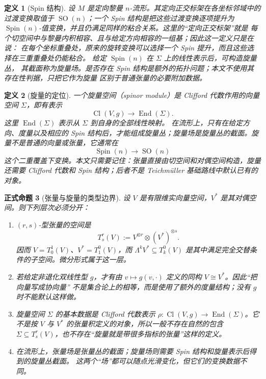 \documentclass[UTF8,fontset=none,a4paper,11pt]{ctexart}
\theoremstyle{foundation-definition}
\newtheorem{definition}{定义}[section]
\theoremstyle{foundation-theorem}
\theoremstyle{foundation-proposition}
\newtheorem{proposition}[definition]{正式命题}
\theoremstyle{foundation-example}
\theoremstyle{foundation-remark}
\theoremstyle{foundation-theorem}
\begin{document}
\begin{definition}[Spin 结构]\label{def:spin-structure}
设 \(M\) 是定向黎曼 \(n\)-流形。其定向正交标架在各坐标邻域中的过渡变换取值于
\(\operatorname{SO}(n)\)；一个 Spin 结构是把这些过渡变换逐项提升为
\(\operatorname{Spin}(n)\)-值变换，并且仍满足同样的粘合关系。这里的“定向正交标架”就是
每个切空间中与黎曼内积相容、且与给定方向相容的一组基；因此这一定义只是在说：
在每个坐标重叠处，原来的旋转变换可以选择一个 Spin 提升，而且这些选择在三重重叠处仍能粘合。
给定 \(\operatorname{Spin}(n)\) 在 \(\Sigma\) 上的线性表示后，可构造旋量丛，
其截面称为旋量场。是否存在 Spin 结构是额外的拓扑问题；本文不使用其存在性判据，只把它作为旋量
区别于普通张量的必要附加数据。
\end{definition}

\begin{definition}[旋量的定位]\label{def:spinor}
一个旋量空间（spinor module）是 Clifford 代数作用的向量空间 \(\Sigma\)，即有表示
\[
\operatorname{Cl}(V,g)\longrightarrow\operatorname{End}(\Sigma).
\]
这里 \(\operatorname{End}(\Sigma)\) 表示从 \(\Sigma\) 到自身的全部线性映射。
在流形上，只有在给定方向、度量以及相应的 Spin 结构后，才能组成旋量丛；旋量场是旋量丛的截面。旋量不是普通的向量或张量，它通常在
\[
\operatorname{Spin}(n)\longrightarrow\operatorname{SO}(n)
\]
这个二重覆盖下变换。本文只需要记住：张量直接由切空间和对偶空间构造，旋量还需要 Clifford 代数和 Spin 结构；后者不是 Teichmüller 基础路线中默认已有的对象。
\end{definition}

\begin{proposition}[张量与旋量的类型边界]\label{prop:tensor-spinor-type-check}
设 \(V\) 是有限维实向量空间，\(V^*\) 是其对偶空间。则下列层次必须分开：
\begin{enumerate}[label=(\arabic*)]
  \item \((r,s)\)-型张量的空间是
  \[
    T^r_s(V):=V^{\otimes r}\otimes(V^*)^{\otimes s}.
  \]
  因而 \(V=T^1_0(V)\)、\(V^*=T^0_1(V)\)，而 \(\Lambda^kV^*\subseteq T^0_k(V)\)
  是其中满足完全交替条件的子空间。微分形式属于这一层。
  \item 若给定非退化双线性型 \(g\)，才有由
  \(v\mapsto g(v,\mathord\cdot)\) 定义的同构 \(V\cong V^*\)。因此“把向量写成协向量”
  不是集合论上的相等，而是使用了额外的度量结构；没有 \(g\) 时不能默认这样做。
  \item 旋量空间 \(\Sigma\) 的基本数据是 Clifford 代数表示
  \(\rho:\operatorname{Cl}(V,g)\to\operatorname{End}(\Sigma)\)。它不是按
  \(V\) 与 \(V^*\) 的张量积定义的对象，所以一般不存在自然的包含
  \(\Sigma\subseteq T^r_s(V)\)，也不存在“旋量就是带很多指标的张量”这样的定义。
  \item 在流形上，张量场是张量丛的截面；旋量场则需要 Spin 结构和旋量表示后得到的旋量丛截面。
  这两个“场”都可以随点光滑变化，但它们的变换数据不同。
\end{enumerate}
\end{proposition}
\end{document}
